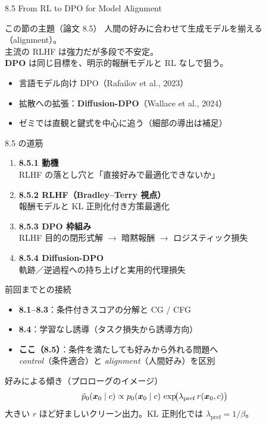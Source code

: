

\begin{frame}{8.5 From RL to DPO for Model Alignment}
    \begin{block}{この節の主題（論文 8.5）}
        人間の好みに合わせて生成モデルを揃える（alignment）。\\
        主流の RLHF は強力だが多段で不安定。\\
        \textbf{DPO} は同じ目標を、明示的報酬モデルと RL なしで狙う。
    \end{block}
    \begin{itemize}
        \item 言語モデル向け DPO（Rafailov et al., 2023）
        \item 拡散への拡張：\textbf{Diffusion-DPO}（Wallace et al., 2024）
        \item ゼミでは直観と鍵式を中心に追う（細部の導出は補足）
    \end{itemize}
\end{frame}
\asmain
\begin{frame}{8.5 の道筋}
    \begin{enumerate}
        \item \textbf{8.5.1 動機}\\
        RLHF の落とし穴と「直接好みで最適化できないか」
        \item \textbf{8.5.2 RLHF（Bradley--Terry 視点）}\\
        報酬モデルと KL 正則化付き方策最適化
        \item \textbf{8.5.3 DPO 枠組み}\\
        RLHF 目的の閉形式解 $\to$ 暗黙報酬 $\to$ ロジスティック損失
        \item \textbf{8.5.4 Diffusion-DPO}\\
        軌跡／逆過程への持ち上げと実用的代理損失
    \end{enumerate}
\end{frame}
\asmain
\begin{frame}{前回までとの接続}
    \begin{itemize}
        \item \textbf{8.1--8.3}：条件付きスコアの分解と CG / CFG
        \item \textbf{8.4}：学習なし誘導（タスク損失から誘導方向）
        \item \textbf{ここ（8.5）}：条件を満たしても好みから外れる問題へ\\
        \emph{control}（条件適合）と \emph{alignment}（人間好み）を区別
    \end{itemize}
    \begin{exampleblock}{好みによる傾き（プロローグのイメージ）}
        \[
            \tilde p_0(\bm{x}_0\mid c)
            \propto
            p_0(\bm{x}_0\mid c)\,
            \exp\!\bigl(\lambda_{\mathrm{pref}}\, r(\bm{x}_0,c)\bigr)
        \]
        大きい $r$ ほど好ましいクリーン出力。KL 正則化では $\lambda_{\mathrm{pref}}=1/\beta$。
    \end{exampleblock}
\end{frame}
